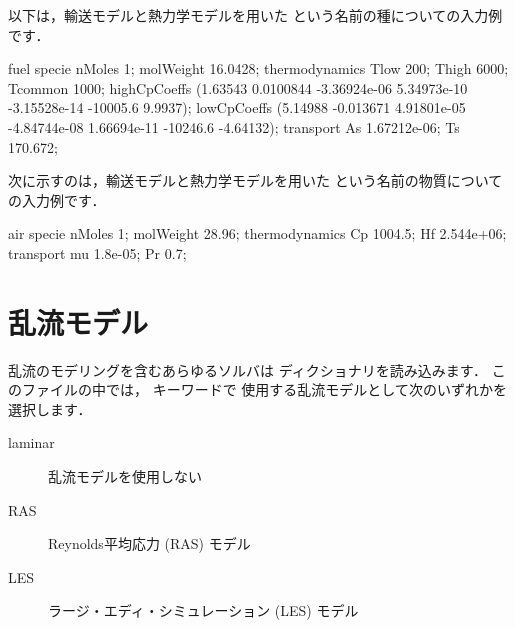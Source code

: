 以下は，輸送モデルと熱力学モデルを用いた
という名前の種についての入力例です．
%
%
%
%
%
%
%
%
%
%
\begin{OFverbatim}[file]
fuel
{
    specie
    {
        nMoles       1;
        molWeight    16.0428;
    }
    thermodynamics
    {
        Tlow         200;
        Thigh        6000;
        Tcommon      1000;
        highCpCoeffs (1.63543 0.0100844 -3.36924e-06 5.34973e-10
                      -3.15528e-14 -10005.6 9.9937);
        lowCpCoeffs  (5.14988 -0.013671 4.91801e-05 -4.84744e-08
                      1.66694e-11 -10246.6 -4.64132);
    }
    transport
    {
        As           1.67212e-06;
        Ts           170.672;
    }
}
\end{OFverbatim}
次に示すのは，輸送モデルと熱力学モデルを用いた
という名前の物質についての入力例です．
\begin{OFverbatim}[file]
air
{
    specie
    {
        nMoles          1;
        molWeight       28.96;
    }
    thermodynamics
    {
        Cp              1004.5;
        Hf              2.544e+06;
    }
    transport
    {
        mu              1.8e-05;
        Pr              0.7;
    }
}
\end{OFverbatim}



\section{乱流モデル}
\label{sec:7.2}
乱流のモデリングを含むあらゆるソルバは
%
%
ディクショナリを読み込みます．
このファイルの中では，
%
%
キーワードで
使用する乱流モデルとして次のいずれかを選択します．
\begin{description}
 \item[laminar]
%
%
            乱流モデルを使用しない
 \item[RAS]
%
%
            Reynolds平均応力 (RAS) モデル
 \item[LES]
%
%
            ラージ・エディ・シミュレーション (LES) モデル
\end{description}

